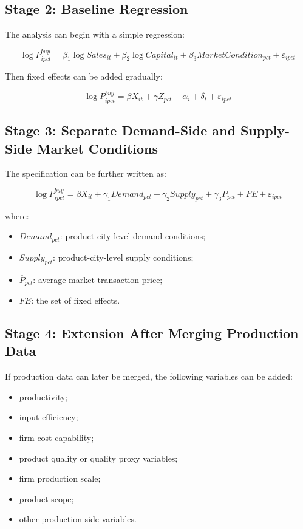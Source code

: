 \documentclass[11pt,a4paper]{article}
\begin{document}
\subsection{Stage 2: Baseline Regression}

The analysis can begin with a simple regression:

\[
\log P^{buy}_{i p c t}
=
\beta_1 \log Sales_{it}
+
\beta_2 \log Capital_{it}
+
\beta_3 MarketCondition_{pct}
+
\varepsilon_{ipct}
\]

Then fixed effects can be added gradually:

\[
\log P^{buy}_{i p c t}
=
\beta X_{it}
+
\gamma Z_{pct}
+
\alpha_i
+
\delta_t
+
\varepsilon_{ipct}
\]

\subsection{Stage 3: Separate Demand-Side and Supply-Side Market Conditions}

The specification can be further written as:

\[
\log P^{buy}_{i p c t}
=
\beta X_{it}
+
\gamma_1 Demand_{pct}
+
\gamma_2 Supply_{pct}
+
\gamma_3 \overline{P}_{pct}
+
FE
+
\varepsilon_{ipct}
\]

where:

\begin{itemize}
    \item \(Demand_{pct}\): product-city-level demand conditions;
    \item \(Supply_{pct}\): product-city-level supply conditions;
    \item \(\overline{P}_{pct}\): average market transaction price;
    \item \(FE\): the set of fixed effects.
\end{itemize}

\subsection{Stage 4: Extension After Merging Production Data}

If production data can later be merged, the following variables can be added:

\begin{itemize}
    \item productivity;
    \item input efficiency;
    \item firm cost capability;
    \item product quality or quality proxy variables;
    \item firm production scale;
    \item product scope;
    \item other production-side variables.
\end{itemize}
\end{document}
